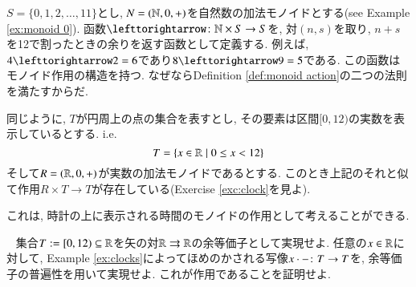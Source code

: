 \begin{example}\label{ex:clocks}


$S=\{0,1,2,\ldots,11\}$とし, $N=({\mathbb N},0,+)$を自然数の加法モノイドとする(see Example \ref{ex:monoid 0}). 函数$\acts\taking\NN\times S\to S$を, 対$(n,s)$を取り, $n+s$を12で割ったときの余りを返す函数として定義する. 例えば, $4\acts 2=6$であり$8\acts 9 = 5$である. この函数はモノイド作用の構造を持つ. なぜならDefinition \ref{def:monoid action}の二つの法則を満たすからだ.


同じように, $T$が円周上の点の集合を表すとし, その要素は区間$[0,12)$の実数を表示しているとする. i.e. $$T=\{x\in{\mathbb R}{\;|\;}0\leq x< 12\}$$ そして$R=({\mathbb R},0,+)$が実数の加法モノイドであるとする. このとき上記のそれと似て作用$R\times T\to T$が存在している(Exercise \ref{exc:clock}を見よ).

これは, 時計の上に表示される時間のモノイドの作用として考えることができる.

\end{example}

\begin{exercise}\label{exc:clock}~
\sexc 集合$T:=[0,12)\subseteq{\mathbb R}$を矢の対${\mathbb R}\rightrightarrows{\mathbb R}$の余等価子として実現せよ. 
\next 任意の$x\in{\mathbb R}$に対して, Example \ref{ex:clocks}によってほめのかされる写像$x\cdot-\colon T\rightarrow T$を, 余等価子の普遍性を用いて実現せよ. 
\next これが作用であることを証明せよ.
\endsexc
\end{exercise}


